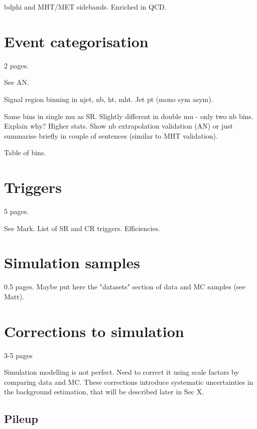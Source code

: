 bdphi and MHT/MET sidebands. Enriched in QCD.

\section{Event categorisation}
2 pages.

See AN.

Signal region binning in njet, nb, ht, mht. 
Jet pt (mono sym asym).

Same bins in single mu as SR.
Slightly different in double mu - only two nb bins. Explain why? Higher stats. 
Show nb extrapolation validation (AN) or just summarise briefly in couple of 
sentences (similar to MHT validation).

Table of bins.



\section{Triggers}
\label{sec:analysis-trigger}
5 pages.

See Mark.
List of SR and CR triggers.
Efficiencies.

\section{Simulation samples}
0.5 pages.
Maybe put here the "datasets" section of data and MC samples (see Matt).

\section{Corrections to simulation}
3-5 pages

Simulation modelling is not perfect. Need to correct it using scale factors by 
comparing data and MC. These corrections introduce systematic uncertainties in 
the background estimation, that will be described later in Sec X.

\subsection{Pileup}
